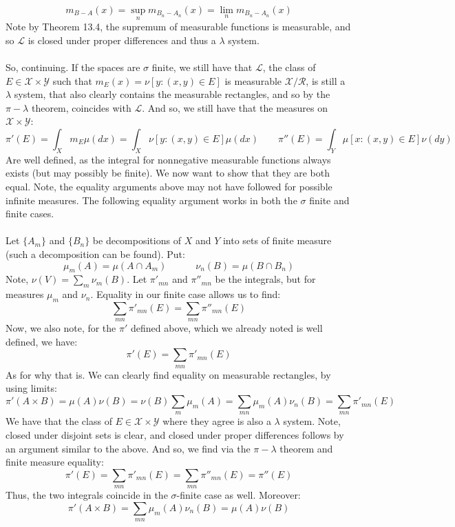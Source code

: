 \documentclass[12pt,a4paper]{article}
\newcommand{\1}[1]{\mathbbm{1}\left\{ #1 \right\}}
\newcommand{\lcal}{\mathcal{L}}
\newcommand{\rcal}{\mathcal{R}}
\newcommand{\xcal}{\mathcal{X}}
\newcommand{\ycal}{\mathcal{Y}}
\begin{document}
$$
	m_{B - A}(x) = \sup_n m_{B_n - A_n}(x) =
	\lim_n m_{B_n - A_n}(x)
$$
Note by Theorem 13.4, the supremum of measurable functions is measurable, and so $\lcal$ is closed under proper differences and thus a $\lambda$ system.
\\\\
So, continuing. If the spaces are $\sigma$ finite, we still have that $\lcal$, the class of $E \in \xcal \times \ycal$ such that $m_E(x) = \nu\left[y : (x,y) \in E\right]$ is measurable $\xcal/\rcal$, is still a $\lambda$ system, that also clearly contains the measurable rectangles, and so by the $\pi-\lambda$ theorem, coincides with $\lcal$. And so, we still have that the measures on $\xcal \times \ycal$:
$$
	\pi'(E) = \int_X m_E \mu(dx) = \int_X \nu[y : (x,y) \in E] \mu(dx) \quad\quad
	\pi''(E) = \int_Y \mu\left[x : (x,y) \in E\right] \nu(dy)
$$
Are well defined, as the integral for nonnegative measurable functions always exists (but may possibly be finite). We now want to show that they are both equal. Note, the equality arguments above may not have followed for possible infinite measures. The following equality argument works in both the $\sigma$ finite and finite cases.
\\\\
Let $\{A_m\}$ and $\{B_n\}$ be decompositions of $X$ and $Y$ into sets of finite measure (such a decomposition can be found). Put:
$$
	\mu_m(A) = \mu(A \cap A_m) \quad\quad\quad
	\nu_n(B) = \mu(B \cap B_n)
$$
Note, $\nu(V) = \sum_m \nu_m(B)$. Let $\pi'_{mn}$ and $\pi''_{mn}$ be the integrals, but for measures $\mu_m$ and $\nu_n$. Equality in our finite case allows us to find:
$$
	\sum_{mn} \pi'_{mn}(E) = \sum_{mn} \pi''_{mn}(E)
$$
Now, we also note, for the $\pi'$ defined above, which we already noted is well defined, we have:
$$
	\pi'(E) = \sum_{mn} \pi'_{mn}(E)
$$
As for why that is. We can clearly find equality on measurable rectangles, by using limits:
$$
	\pi'(A \times B) = \mu(A)\nu(B) = \nu(B)\sum_m \mu_m(A) =
	\sum_{mn} \mu_m(A)\nu_n(B) = \sum_{mn} \pi'_{mn}(E)
$$
We have that the class of $E \in \xcal \times \ycal$ where they agree is also a $\lambda$ system. Note, closed under disjoint sets is clear, and closed under proper differences follows by an argument similar to the above. And so, we find via the $\pi-\lambda$ theorem and finite measure equality:
$$
	\pi'(E) = \sum_{mn} \pi'_{mn}(E) =
	\sum_{mn} \pi''_{mn}(E) = \pi''(E)
$$
Thus, the two integrals coincide in the $\sigma$-finite case as well. Moreover:
$$
	\pi'(A \times B) = \sum_{mn} \mu_m(A)\nu_n(B) = \mu(A)\nu(B)
$$
\end{document}
